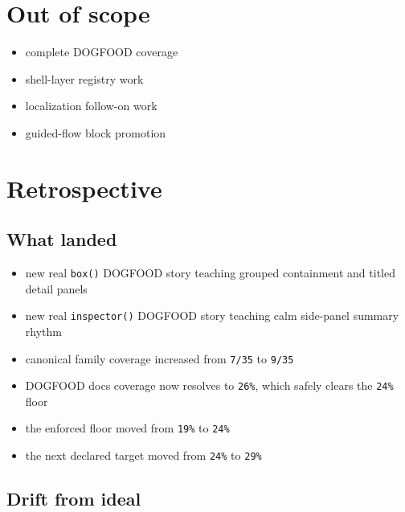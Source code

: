 \section{Out of scope}\label{record-068-out-of-scope}

\begin{itemize}
\tightlist
\item
  complete DOGFOOD coverage
\item
  shell-layer registry work
\item
  localization follow-on work
\item
  guided-flow block promotion
\end{itemize}

\section{Retrospective}\label{record-068-retrospective}

\subsection{What landed}\label{record-068-what-landed}

\begin{itemize}
\tightlist
\item
  new real \texttt{b\allowbreak{}o\allowbreak{}x\allowbreak{}(\allowbreak{})} DOGFOOD story teaching grouped containment and titled detail panels
\item
  new real \texttt{i\allowbreak{}n\allowbreak{}s\allowbreak{}p\allowbreak{}e\allowbreak{}c\allowbreak{}t\allowbreak{}o\allowbreak{}r\allowbreak{}(\allowbreak{})} DOGFOOD story teaching calm side-panel summary rhythm
\item
  canonical family coverage increased from \texttt{7\allowbreak{}/\allowbreak{}3\allowbreak{}5} to \texttt{9\allowbreak{}/\allowbreak{}3\allowbreak{}5}
\item
  DOGFOOD docs coverage now resolves to \texttt{2\allowbreak{}6\allowbreak{}\%}, which safely clears the \texttt{2\allowbreak{}4\allowbreak{}\%} floor
\item
  the enforced floor moved from \texttt{1\allowbreak{}9\allowbreak{}\%} to \texttt{2\allowbreak{}4\allowbreak{}\%}
\item
  the next declared target moved from \texttt{2\allowbreak{}4\allowbreak{}\%} to \texttt{2\allowbreak{}9\allowbreak{}\%}
\end{itemize}

\subsection{Drift from ideal}\label{record-068-drift-from-ideal}

